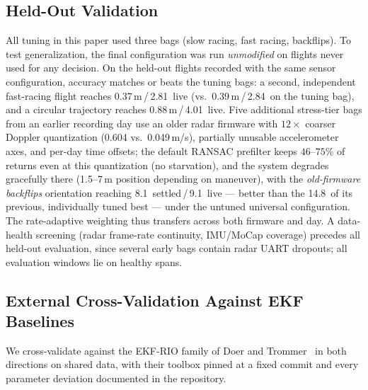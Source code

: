 \documentclass[journal]{IEEEtran}
\begin{document}
\subsection{Held-Out Validation}
\label{sec:heldout}
All tuning in this paper used three bags (slow racing, fast racing,
backflips).  To test generalization, the final configuration was run
\emph{unmodified} on flights never used for any decision.
On the held-out flights recorded with the same sensor configuration,
accuracy matches or beats the tuning bags: a second, independent
fast-racing flight reaches 0.37\,m\,/\,2.81\degree\ live
(vs.\ 0.39\,m\,/\,2.84\degree\ on the tuning bag), and a circular
trajectory reaches 0.88\,m\,/\,4.01\degree\ live.
Five additional stress-tier bags from an earlier recording day use an
older radar firmware with $12\times$ coarser Doppler quantization
(0.604 vs.\ 0.049\,m/s), partially unusable accelerometer axes, and
per-day time offsets; the default RANSAC prefilter keeps
$46$--$75\%$ of returns even at this quantization (no starvation), and
the system degrades gracefully there
(1.5--7\,m position depending on maneuver), with the
\emph{old-firmware backflips} orientation reaching
8.1\degree\ settled\,/\,9.1\degree\ live --- better than the
14.8\degree\ of its previous, individually tuned best --- under the
untuned universal configuration.  The rate-adaptive weighting thus
transfers across both firmware and day.
A data-health screening (radar frame-rate continuity, IMU/MoCap
coverage) precedes all held-out evaluation, since several early bags
contain radar UART dropouts; all evaluation windows lie on healthy
spans.

\subsection{External Cross-Validation Against EKF Baselines}
\label{sec:baselines}
We cross-validate against the EKF-RIO family of Doer and
Trommer~\cite{doer2020ekf,doer2021yrio} in both directions on shared
data, with their toolbox pinned at a fixed commit and every parameter
deviation documented in the repository.
\end{document}
